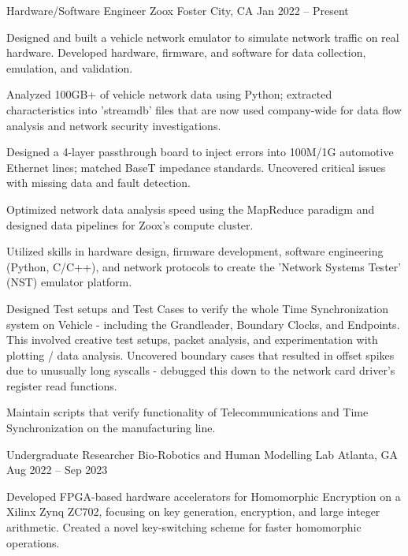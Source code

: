 \documentclass[]{awesome-cv}
\begin{document}
\begin{cventries}
    \cventry
    {Hardware/Software Engineer}
    {Zoox}
    {Foster City, CA}
    {Jan 2022 – Present}
        {\begin{cvitems}
        \item {Designed and built a vehicle network emulator to simulate network traffic on real hardware. Developed hardware, firmware, and software for data collection, emulation, and validation.}
        \item {Analyzed 100GB+ of vehicle network data using Python; extracted characteristics into 'streamdb' files that are now used company-wide for data flow analysis and network security investigations.}
        \item {Designed a 4-layer passthrough board to inject errors into 100M/1G automotive Ethernet lines; matched BaseT impedance standards. Uncovered critical issues with missing data and fault detection.}
        \item {Optimized network data analysis speed using the MapReduce paradigm and designed data pipelines for Zoox's compute cluster.}
        \item {Utilized skills in hardware design, firmware development, software engineering (Python, C/C++), and network protocols to create the 'Network Systems Tester' (NST) emulator platform.}
        \item {Designed Test setups and Test Cases to verify the whole Time Synchronization system on Vehicle - including the Grandleader, Boundary Clocks, and Endpoints. This involved creative test setups, packet analysis, and experimentation with plotting / data analysis. Uncovered boundary cases that resulted in offset spikes due to unusually long syscalls - debugged this down to the network card driver's register read functions.}
        \item {Maintain scripts that verify functionality of Telecommunications and Time Synchronization on the manufacturing line.}
    \end{cvitems}}
    \cventry
	{Undergraduate Researcher}
    {Bio-Robotics and Human Modelling Lab}
    {Atlanta, GA}
    {Aug 2022 – Sep 2023}
    {\begin{cvitems}
        \item {Developed FPGA-based hardware accelerators for Homomorphic Encryption on a Xilinx Zynq ZC702, focusing on key generation, encryption, and large integer arithmetic. Created a novel key-switching scheme for faster homomorphic operations.}

\end{cvitems}}
\end{cventries}
\end{document}
